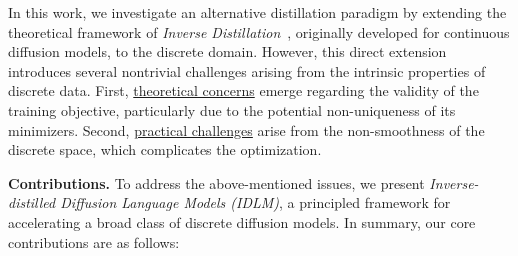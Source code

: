  
  In this work, we investigate an alternative distillation paradigm by extending the theoretical framework of \emph{Inverse Distillation}~\citep{gushchin2025inverse, kornilov2025universal}, originally developed for continuous diffusion models, to the discrete domain. However, this direct extension introduces several nontrivial challenges arising from the intrinsic properties of discrete data. First, \underline{theoretical concerns} emerge regarding the validity of the training objective, particularly due to the potential non-uniqueness of its minimizers. Second, \underline{practical challenges} arise from the non-smoothness of the discrete space, which complicates the optimization. 
  
  \textbf{Contributions.} To address the above-mentioned issues, we present \emph{Inverse-distilled Diffusion Language Models (IDLM)}, a principled framework for accelerating a broad class of discrete diffusion models. In summary, our core contributions are as follows:
  \vspace{-0.9em}

